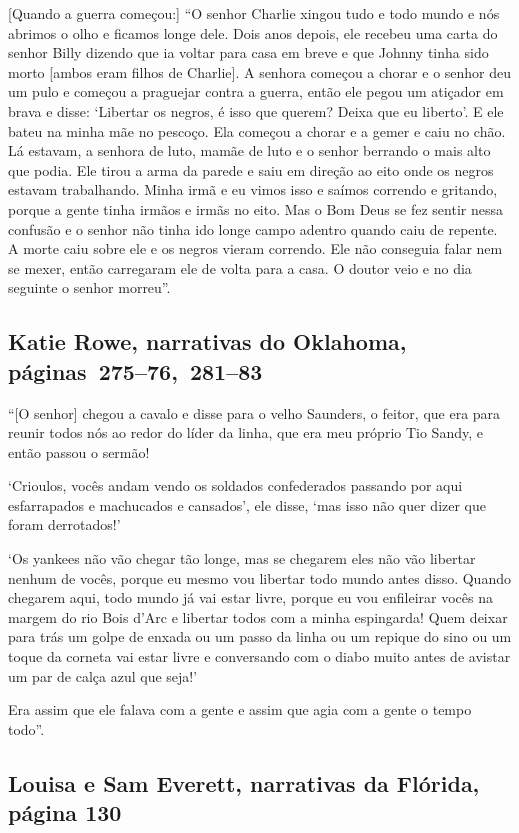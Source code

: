 {[}Quando a guerra começou:{]} ``O senhor Charlie xingou tudo e todo mundo e
nós abrimos o olho e ficamos longe dele. Dois anos depois, ele recebeu
uma carta do senhor Billy dizendo que ia voltar para casa em breve e que
Johnny tinha sido morto {[}ambos eram filhos de Charlie{]}. A senhora
começou a chorar e o senhor deu um pulo e começou a praguejar contra a
guerra, então ele pegou um atiçador em brava e disse: `Libertar os
negros, é isso que querem? Deixa que eu liberto'. E ele bateu na minha
mãe no pescoço. Ela começou a chorar e a gemer e caiu no chão. Lá
estavam, a senhora de luto, mamãe de luto e o senhor berrando o mais
alto que podia. Ele tirou a arma da parede e saiu em direção ao eito
onde os negros estavam trabalhando. Minha irmã e eu vimos isso e saímos
correndo e gritando, porque a gente tinha irmãos e irmãs no eito. Mas o
Bom Deus se fez sentir nessa confusão e o senhor não tinha ido longe
campo adentro quando caiu de repente. A morte caiu sobre ele e os negros
vieram correndo. Ele não conseguia falar nem se mexer, então carregaram
ele de volta para a casa. O doutor veio e no dia seguinte o senhor
morreu''.

\subsection{Katie Rowe, narrativas do Oklahoma, páginas~275--76,~281--83}
\label{ref232}

``{[}O senhor{]} chegou a cavalo e disse para o velho Saunders, o
feitor, que era para reunir todos nós ao redor do líder da linha, que
era meu próprio Tio Sandy, e então passou o sermão!

`Crioulos, vocês andam vendo os soldados confederados passando por aqui
esfarrapados e machucados e cansados', ele disse, `mas isso não quer
dizer que foram derrotados!'

`Os yankees não vão chegar tão longe, mas se chegarem eles não vão
libertar nenhum de vocês, porque eu mesmo vou libertar todo mundo antes
disso. Quando chegarem aqui, todo mundo já vai estar livre, porque eu
vou enfileirar vocês na margem do rio Bois d'Arc e libertar todos com a
minha espingarda! Quem deixar para trás um golpe de enxada ou um passo
da linha ou um repique do sino ou um toque da corneta vai estar livre e
conversando com o diabo muito antes de avistar um par de calça azul que
seja!'

Era assim que ele falava com a gente e assim que agia com a gente o
tempo todo''.

\subsection{Louisa e Sam Everett, narrativas da Flórida, página 130} \label{ref85}

